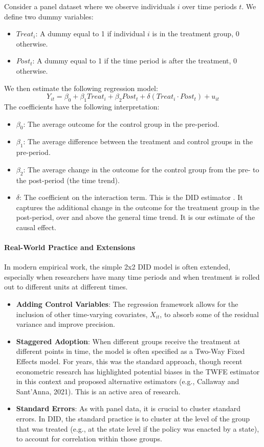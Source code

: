 \documentclass{article}
\providecommand{\tightlist}{
  \setlength{\itemsep}{0pt}
  \setlength{\parskip}{0pt}}
\begin{document}
Consider a panel dataset where we observe individuals $i$ over time periods $t$. We define two dummy variables:
\begin{itemize}
    \tightlist
    \item $Treat_i$: A dummy equal to 1 if individual $i$ is in the treatment group, 0 otherwise.
    \item $Post_t$: A dummy equal to 1 if the time period is after the treatment, 0 otherwise.
\end{itemize}
We then estimate the following regression model:
\begin{equation}
    Y_{it} = \beta_0 + \beta_1 Treat_i + \beta_2 Post_t + \delta (Treat_i \cdot Post_t) + u_{it}
\end{equation}
The coefficients have the following interpretation:
\begin{itemize}
    \tightlist
    \item $\beta_0$: The average outcome for the control group in the pre-period.
    \item $\beta_1$: The average difference between the treatment and control groups in the pre-period.
    \item $\beta_2$: The average change in the outcome for the control group from the pre- to the post-period (the time trend).
    \item $\delta$: The coefficient on the interaction term. This is the 
DID estimator
. It captures the additional change in the outcome for the treatment group in the post-period, over and above the general time trend. It is our estimate of the causal effect.
\end{itemize}

\paragraph{Real-World Practice and Extensions}
In modern empirical work, the simple 2x2 DID model is often extended, especially when researchers have many time periods and when treatment is rolled out to different units at different times.
\begin{itemize}
    \tightlist
    \item 
\textbf{Adding Control Variables}:
 The regression framework allows for the inclusion of other time-varying covariates, $X_{it}$, to absorb some of the residual variance and improve precision.
    \item 
\textbf{Staggered Adoption}:
 When different groups receive the treatment at different points in time, the model is often specified as a Two-Way Fixed Effects model. For years, this was the standard approach, though recent econometric research has highlighted potential biases in the TWFE estimator in this context and proposed alternative estimators (e.g., Callaway and Sant'Anna, 2021). This is an active area of research.
    \item 
\textbf{Standard Errors}:
 As with panel data, it is crucial to cluster standard errors. In DID, the standard practice is to cluster at the level of the group that was treated (e.g., at the state level if the policy was enacted by a state), to account for correlation within those groups.
\end{itemize}
\end{document}
